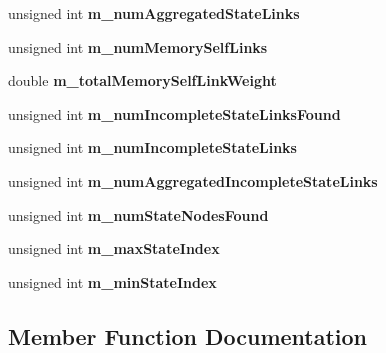 \begin{DoxyCompactItemize}
\item 
\mbox{\label{classMemNetwork_ac9734738693565231f0c0a740c273689}} 
unsigned int {\bfseries m\+\_\+num\+Aggregated\+State\+Links}
\item 
\mbox{\label{classMemNetwork_ab396d47122d220c554a81eafb6670dcc}} 
unsigned int {\bfseries m\+\_\+num\+Memory\+Self\+Links}
\item 
\mbox{\label{classMemNetwork_af17324a2d3a89d8eaeacf4b9f3dc6fbc}} 
double {\bfseries m\+\_\+total\+Memory\+Self\+Link\+Weight}
\item 
\mbox{\label{classMemNetwork_a2bb43754ac441f43da612aa4b0c4f1b9}} 
unsigned int {\bfseries m\+\_\+num\+Incomplete\+State\+Links\+Found}
\item 
\mbox{\label{classMemNetwork_a4549e85a4c7e0b62e0a07783e6cbd4a3}} 
unsigned int {\bfseries m\+\_\+num\+Incomplete\+State\+Links}
\item 
\mbox{\label{classMemNetwork_ad497ebf3a8b142df868d5a92ecb08b07}} 
unsigned int {\bfseries m\+\_\+num\+Aggregated\+Incomplete\+State\+Links}
\item 
\mbox{\label{classMemNetwork_aa374feda8d019ef54d6d45b09f57ca61}} 
unsigned int {\bfseries m\+\_\+num\+State\+Nodes\+Found}
\item 
\mbox{\label{classMemNetwork_a7d9f544e2e8b71812e9605170b07f886}} 
unsigned int {\bfseries m\+\_\+max\+State\+Index}
\item 
\mbox{\label{classMemNetwork_a540d28cc9eb1f7a7f33913251c2399ad}} 
unsigned int {\bfseries m\+\_\+min\+State\+Index}
\end{DoxyCompactItemize}


\subsection{Member Function Documentation}
\mbox{\label{classMemNetwork_aed51978dfece1214f4fa9ea2bfebc492}} 
